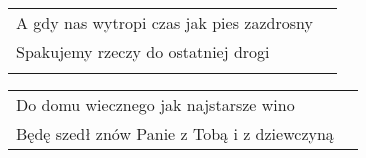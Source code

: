 \documentclass[a5paper]{article}
\begin{document}
\noindent
\begin{tabular}{@{}p{8.5cm}p{3cm}@{}}
A gdy nas wytropi czas jak pies zazdrosny \\ 
Spakujemy rzeczy do ostatniej drogi \\ \\
\end{tabular}

\noindent
\begin{tabular}{@{}p{8.5cm}p{3cm}@{}}
Do domu wiecznego jak najstarsze wino \\
Będę szedł znów Panie z Tobą i z dziewczyną
\end{tabular}
\end{document}
